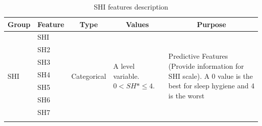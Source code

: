 \documentclass[]{book}
\begin{document}
\begin{table}[ht]
    \centering
    \caption{SHI features description}
    \label{tab:SHI-feature-description}
    \begin{tabular}{|l|l|l|l|l|}
        \hline
        \multicolumn{1}{|c|}{\textbf{Group}} & \multicolumn{1}{c|}{\textbf{Feature}} & \multicolumn{1}{c|}{\textbf{Type}} & \multicolumn{1}{c|}{\textbf{Values}} & \multicolumn{1}{c|}{\textbf{Purpose}}   \\ \hline
        \multirow{21}{*}{SHI}  & SHI  & \multirow{21}{*}{Categorical} & \multirow{21}{3cm}{A level variable. $ 0 < SH*\leq 4 $.} & \multirow{21}{5cm}{Predictive Features (Provide information for SHI scale). A 0 value is the best for sleep hygiene and 4 is the worst} \\ \cline{2-2}
        & SH2                                   &                                    &                                                        &                                                                                                                                         \\ \cline{2-2}
        & SH3                                   &                                    &                                                        &                                                                                                                                         \\ \cline{2-2}
        & SH4                                   &                                    &                                                        &                                                                                                                                         \\ \cline{2-2}
        & SH5                                   &                                    &                                                        &                                                                                                                                         \\ \cline{2-2}
        & SH6                                   &                                    &                                                        &                                                                                                                                         \\ \cline{2-2}
        & SH7                                   &                                    &                                                        &                                                                                                                                         \\ \cline{2-2}

\end{tabular}
\end{table}
\end{document}
